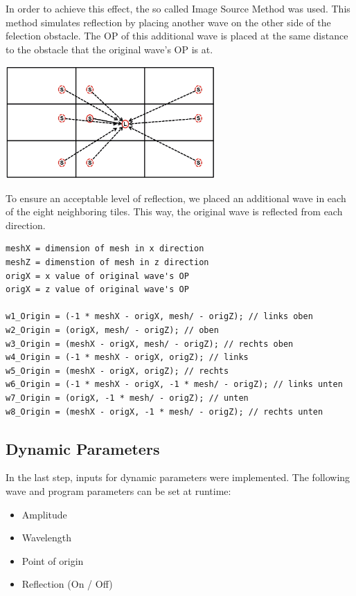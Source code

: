 \documentclass[12pt,a4paper]{scrartcl}
\begin{document}
In order to achieve this effect, the so called Image Source Method was used. This method simulates reflection by placing another wave on the other side of the felection obstacle. The OP of this additional wave is placed at the same distance to the obstacle that the original wave's OP is at.

\begin{center}
	\includegraphics[width=0.6\textwidth]{Images/ImageSourceMethod.jpg}
\end{center}

To ensure an acceptable level of reflection, we placed an additional wave in each of the eight neighboring tiles. This way, the original wave is reflected from each direction.

\begin{lstlisting}[language=PSEUDO]
meshX = dimension of mesh in x direction
meshZ = dimenstion of mesh in z direction
origX = x value of original wave's OP
origX = z value of original wave's OP

w1_Origin = (-1 * meshX - origX, mesh/ - origZ); // links oben
w2_Origin = (origX, mesh/ - origZ); // oben
w3_Origin = (meshX - origX, mesh/ - origZ); // rechts oben
w4_Origin = (-1 * meshX - origX, origZ); // links
w5_Origin = (meshX - origX, origZ); // rechts
w6_Origin = (-1 * meshX - origX, -1 * mesh/ - origZ); // links unten
w7_Origin = (origX, -1 * mesh/ - origZ); // unten
w8_Origin = (meshX - origX, -1 * mesh/ - origZ); // rechts unten
\end{lstlisting}

\subsection{Dynamic Parameters}
In the last step, inputs for dynamic parameters were implemented. The following wave and program parameters can be set at runtime:
\begin{itemize}
	\item Amplitude
	\item Wavelength
	\item Point of origin
	\item Reflection (On / Off)
\end{itemize}
\end{document}
